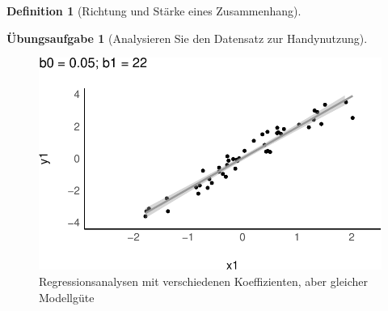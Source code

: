 \documentclass[
  a4paper,
  DIV=11]{scrreprt}
\theoremstyle{definition}
\newtheorem{exercise}{Übungsaufgabe}[chapter]
\theoremstyle{definition}
\theoremstyle{definition}
\newtheorem{definition}{Definition}[chapter]
\theoremstyle{remark}
\begin{document}
\begin{definition}[Richtung und Stärke eines
Zusammenhang]
\begin{exercise}[Analysieren Sie den Datensatz zur
Handynutzung]
\begin{figure}
\begin{minipage}{0.50\linewidth}
{\includegraphics{080-regression1_files/figure-pdf/fig-regr-div-1.pdf}

}


\end{minipage}%
%
\begin{minipage}{0.50\linewidth}



\end{minipage}%

\caption{\label{fig-regr-div}Regressionsanalysen mit verschiedenen
Koeffizienten, aber gleicher Modellgüte}

\end{figure}%


\end{exercise}
\end{definition}
\end{document}
